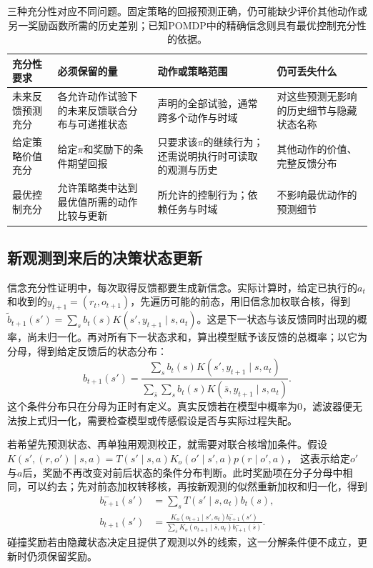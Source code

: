 \begin{table}[htbp]
  \centering
  \small
  \begin{tabularx}{\linewidth}{p{25mm}XXX}
    \toprule
    充分性要求 & 必须保留的量 & 动作或策略范围 & 仍可丢失什么 \\
    \midrule
    未来反馈预测充分 & 各允许动作试验下的未来反馈联合分布与可递推状态 & 声明的全部试验，通常跨多个动作与时域 & 对这些预测无影响的历史细节与隐藏状态名称 \\
    给定策略价值充分 & 给定$\pi$和奖励下的条件期望回报 & 只要求该$\pi$的继续行为；还需说明执行时可读取的观测与历史 & 其他动作的价值、完整反馈分布 \\
    最优控制充分 & 允许策略类中达到最优值所需的动作比较与更新 & 所允许的控制行为；依赖任务与时域 & 不影响最优动作的预测细节 \\
    \bottomrule
  \end{tabularx}
  \caption{三种充分性对应不同问题。固定策略的回报预测正确，仍可能缺少评价其他动作或另一奖励函数所需的历史差别；已知POMDP中的精确信念则具有最优控制充分性的依据。}
  \label{tab:rl-information-sufficiency}
\end{table}

\subsection{新观测到来后的决策状态更新}
\label{sec:rl-information-filtering}

信念充分性证明中，每次取得反馈都要生成新信念。实际计算时，给定已执行的$a_t$和收到的$y_{t+1}=(r_t,o_{t+1})$，先遍历可能的前态，用旧信念加权联合核，得到
$\widetilde b_{t+1}(s')=\sum_s b_t(s)K(s',y_{t+1}\mid s,a_t)$。这是下一状态与该反馈同时出现的概率，尚未归一化。再对所有下一状态求和，算出模型赋予该反馈的总概率；以它为分母，得到给定反馈后的状态分布：
\begin{equation}
  \label{eq:rl-information-bayes}
  b_{t+1}(s')
  =\frac{\sum_s b_t(s)K(s',y_{t+1}\mid s,a_t)}
         {\sum_{\bar s}\sum_s b_t(s)K(\bar s,y_{t+1}\mid s,a_t)}.
\end{equation}
这个条件分布只在分母为正时有定义。真实反馈若在模型中概率为0，滤波器便无法按上式归一化，需要检查模型或传感假设是否与实际过程失配。

若希望先预测状态、再单独用观测校正，就需要对联合核增加条件。假设
$K(s',(r,o')\mid s,a)=T(s'\mid s,a)K_o(o'\mid s',a)p(r\mid o',a)$，
这表示给定$o'$与$a$后，奖励不再改变对前后状态的条件分布判断。此时奖励项在分子分母中相同，可以约去；先对前态加权转移核，再按新观测的似然重新加权和归一化，得到
\begin{align}
  \label{eq:rl-information-predict-correct}
  b_{t+1}^{-}(s')&=\sum_sT(s'\mid s,a_t)b_t(s),\\
  b_{t+1}(s')&=
  \frac{K_o(o_{t+1}\mid s',a_t)b_{t+1}^{-}(s')}
       {\sum_{\bar s}K_o(o_{t+1}\mid\bar s,a_t)b_{t+1}^{-}(\bar s)}.
  \nonumber
\end{align}
碰撞奖励若由隐藏状态决定且提供了观测以外的线索，这一分解条件便不成立，更新时仍须保留奖励。

